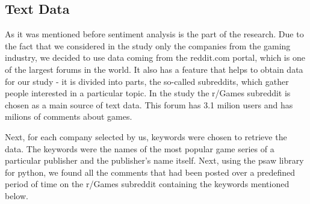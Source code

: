 \documentclass[11pt]{article} %
\begin{document}
\subsection{Text Data}
As it was mentioned before sentiment analysis is the part of the research. Due to the fact that we considered in the study only the companies from the gaming industry, we decided to use data coming from the reddit.com portal, which is one of the largest forums in the world. It also has a feature that helps to obtain data for our study - it is divided into parts, the so-called subreddits, which gather people interested in a particular topic. In the study the r/Games subreddit is chosen as a main source of text data. This forum has 3.1 milion users and has milions of comments about games. 

Next, for each company selected by us, keywords were chosen to retrieve the data. The keywords were the names of the most popular game series of a particular publisher and the publisher's name itself. Next, using the psaw library for python, we found all the comments that had been posted over a predefined period of time on the r/Games subreddit containing the keywords mentioned below. 
\end{document}
